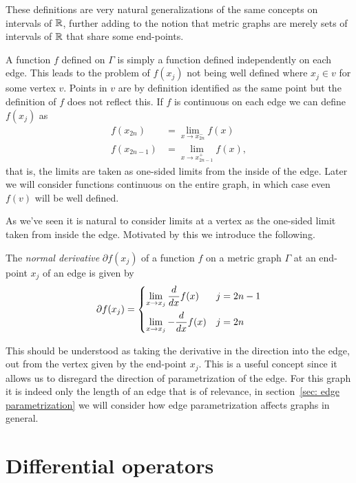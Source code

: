 These definitions are very natural generalizations of the same concepts on intervals of $\mathbb{R}$, further adding to the notion that metric graphs are merely sets of intervals of $\mathbb{R}$ that share some end-points.

A function $f$ defined on $\Gamma$ is simply a function defined independently on each edge. This leads to the problem of $f(x_j)$ not being well defined where $x_j \in v$ for some vertex $v$. Points in $v$ are by definition identified as the same point but the definition of $f$ does not reflect this. If $f$ is continuous on each edge we can define $f(x_j)$ as
\begin{align*}
  f(x_{2n}) &= \lim_{x \to x_{2n}^-} f(x) \\
  f(x_{2n-1}) &= \lim_{x \to x_{2n-1}^+} f(x),
\end{align*}
that is, the limits are taken as one-sided limits from the inside of the edge. Later we will consider functions continuous on the entire graph, in which case even $f(v)$ will be well defined.

As we've seen it is natural to consider limits at a vertex as the one-sided limit taken from inside the edge. Motivated by this we introduce the following.

\begin{definition}
  The \emph{normal derivative} $\partial f(x_j)$ of a function $f$ on a metric graph $\Gamma$ at an end-point $x_j$ of an edge is given by
  \begin{align}
    \partial f(x_j) =
    \begin{dcases}
      \lim_{x \to x_j}   \frac{d}{dx} f(x) & j = 2n-1 \\
      \lim_{x \to x_j} - \frac{d}{dx} f(x) & j = 2n
    \end{dcases}
  \end{align}
\end{definition}

This should be understood as taking the derivative in the direction into the edge, out from the vertex given by the end-point $x_j$. This is a useful concept since it allows us to disregard the direction of parametrization of the edge. For this graph it is indeed only the length of an edge that is of relevance, in section~\ref{sec: edge parametrization} we will consider how edge parametrization affects graphs in general.



\section{Differential operators}\label{sec: differential operators}

